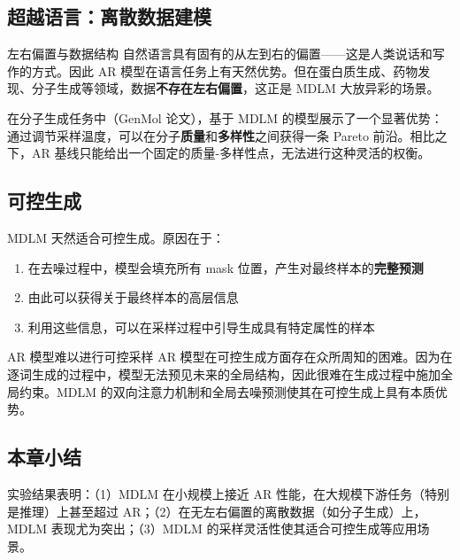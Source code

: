 \subsection{超越语言：离散数据建模}

\begin{knowledgebox}{左右偏置与数据结构}
自然语言具有固有的从左到右的偏置——这是人类说话和写作的方式。因此 AR 模型在语言任务上有天然优势。但在蛋白质生成、药物发现、分子生成等领域，数据\textbf{不存在左右偏置}，这正是 MDLM 大放异彩的场景。
\end{knowledgebox}

在分子生成任务中（GenMol 论文），基于 MDLM 的模型展示了一个显著优势：通过调节采样温度，可以在分子\textbf{质量}和\textbf{多样性}之间获得一条 Pareto 前沿。相比之下，AR 基线只能给出一个固定的质量-多样性点，无法进行这种灵活的权衡。

\subsection{可控生成}

MDLM 天然适合可控生成。原因在于：

\begin{enumerate}
    \item 在去噪过程中，模型会填充所有 mask 位置，产生对最终样本的\textbf{完整预测}
    \item 由此可以获得关于最终样本的高层信息
    \item 利用这些信息，可以在采样过程中引导生成具有特定属性的样本
\end{enumerate}

\begin{warningbox}{AR 模型难以进行可控采样}
AR 模型在可控生成方面存在众所周知的困难。因为在逐词生成的过程中，模型无法预见未来的全局结构，因此很难在生成过程中施加全局约束。MDLM 的双向注意力机制和全局去噪预测使其在可控生成上具有本质优势。
\end{warningbox}

\subsection{本章小结}

实验结果表明：（1）MDLM 在小规模上接近 AR 性能，在大规模下游任务（特别是推理）上甚至超过 AR；（2）在无左右偏置的离散数据（如分子生成）上，MDLM 表现尤为突出；（3）MDLM 的采样灵活性使其适合可控生成等应用场景。

\newpage
